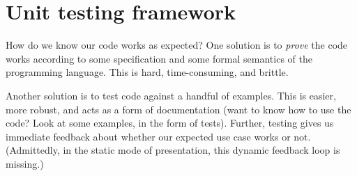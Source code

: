 
\section{Unit testing framework}

\begin{node}
How do we know our code works as expected? One solution is to
\emph{prove} the code works according to some specification and some
formal semantics of the programming language. This is hard,
time-consuming, and brittle.

Another solution is to test code against a handful of
examples. This is easier, more robust, and acts as a form of
documentation (want to know how to use the code? Look at some
examples, in the form of tests). Further, testing gives us immediate
feedback about whether our expected use case works or
not. (Admittedly, in the static mode of presentation, this dynamic
feedback loop is missing.)
\end{node}

